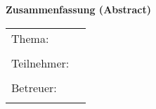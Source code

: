 \begin{center}
{\Large \textbf{Zusammenfassung (Abstract)}}
\end{center}

\bigskip

\begin{center}
	\begin{tabular}{p{2.8cm}p{10cm}}
		Thema: & \thema \\
		 & \\
		Teilnehmer: & \autor \\
		 & \\
		Betreuer: & \betreuer \\
		 & \\
	\end{tabular}
\end{center}

\bigskip

\noindent
\zusammenfassung